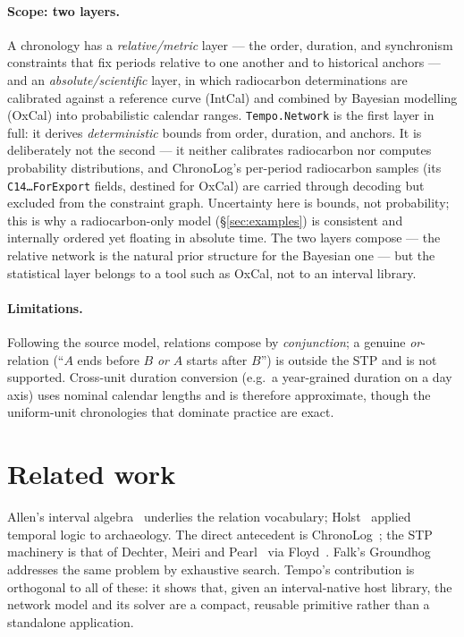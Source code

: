 \documentclass[a4paper,USenglish,cleveref,autoref,thm-restate]{oasics-v2021}
\begin{document}
\paragraph{Scope: two layers.} A chronology has a \emph{relative/metric}
layer --- the order, duration, and synchronism constraints that fix
periods relative to one another and to historical anchors --- and an
\emph{absolute/scientific} layer, in which radiocarbon determinations are
calibrated against a reference curve (IntCal) and combined by Bayesian
modelling (OxCal) into probabilistic calendar ranges.
\texttt{Tempo.Network} is the first layer in full: it derives
\emph{deterministic} bounds from order, duration, and anchors. It is
deliberately not the second --- it neither calibrates radiocarbon nor
computes probability distributions, and ChronoLog's per-period
radiocarbon samples (its \texttt{C14\dots ForExport} fields, destined for
OxCal) are carried through decoding but excluded from the constraint
graph. Uncertainty here is bounds, not probability; this is why a
radiocarbon-only model (§\ref{sec:examples}) is consistent and internally
ordered yet floating in absolute time. The two layers compose --- the
relative network is the natural prior structure for the Bayesian one ---
but the statistical layer belongs to a tool such as OxCal, not to an
interval library.

\paragraph{Limitations.} Following the source model, relations compose
by \emph{conjunction}; a genuine \emph{or}-relation (``$A$ ends before
$B$ \emph{or} $A$ starts after $B$'') is outside the STP and is not
supported. Cross-unit duration conversion (e.g.\ a year-grained
duration on a day axis) uses nominal calendar lengths and is therefore
approximate, though the uniform-unit chronologies that dominate practice
are exact.

\section{Related work}

Allen's interval algebra~\cite{allen1983} underlies the relation
vocabulary; Holst~\cite{holst2004} applied temporal logic to archaeology.
The direct antecedent is ChronoLog~\cite{levy2020,chronolog}; the STP
machinery is that of Dechter, Meiri and Pearl~\cite{dechter1991} via
Floyd~\cite{floyd1962}. Falk's Groundhog~\cite{falk2020} addresses the
same problem by exhaustive search. Tempo's contribution is orthogonal to
all of these: it shows that, given an interval-native host library, the
network model and its solver are a compact, reusable primitive rather
than a standalone application.
\end{document}
